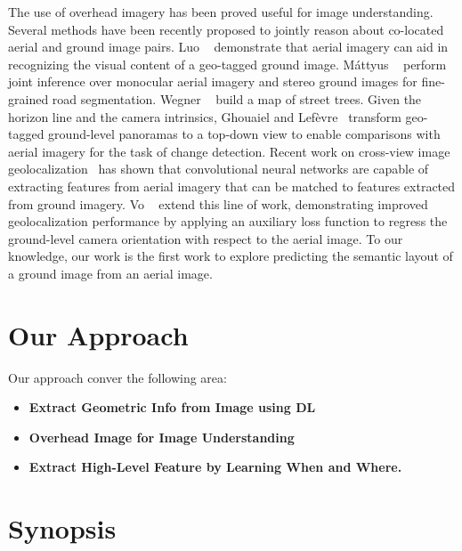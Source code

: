 The use of overhead imagery has been proved useful for image
understanding.
Several methods have been recently proposed to jointly reason about
co-located aerial and ground image pairs. Luo
\etal~\cite{luo2008event} demonstrate that aerial imagery can aid
in recognizing the visual content of a geo-tagged ground image.
M{\'a}ttyus \etal~\cite{mattyus2016hd} perform joint inference over
monocular aerial imagery and stereo ground images for fine-grained
road segmentation. Wegner \etal~\cite{wegner2016cataloging} build a
map of street trees. Given the horizon line and the camera intrinsics,
Ghouaiel and Lef{\`e}vre~\cite{ghouaiel2016coupling} transform
geo-tagged ground-level panoramas to a top-down view to enable
comparisons with aerial imagery for the task of change detection.
Recent work on cross-view image
geolocalization~\cite{lin2013cross,lin2015learning,workman2015geocnn,workman2015wide}
 has shown that convolutional neural
networks are capable of extracting features from aerial imagery
that can be matched to features extracted from ground imagery.
Vo \etal~\cite{vo2016localizing} extend this line of work,
demonstrating improved geolocalization performance by applying an
auxiliary loss function to regress the ground-level camera orientation
with respect to the aerial image. To our knowledge, our work is the
first work to explore predicting the semantic layout of a ground
image from an aerial image.



\section{Our Approach}
Our approach conver the following area:

\begin{itemize}[noitemsep]

  \item \textbf{Extract Geometric Info from Image using DL}

  \item \textbf{Overhead Image for Image Understanding}

  \item \textbf{Extract High-Level Feature by Learning When and Where.}

\end{itemize}


\section{Synopsis}

